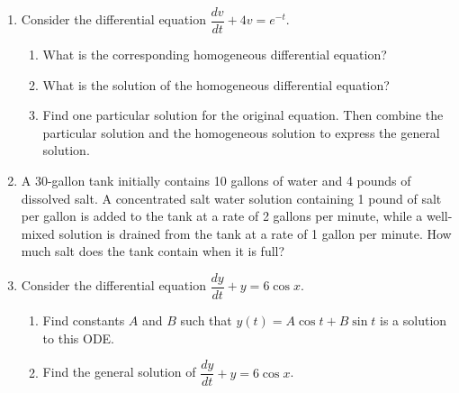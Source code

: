 \documentclass[10pt]{article}
\begin{document}
\newpage
\begin{enumerate}
\setcounter{enumi}{\theenumCount}
\item Consider the differential equation $\dfrac{dv}{dt} + 4v = e^{-t}$.  
\begin{enumerate}
\item What is the corresponding homogeneous differential equation? 
\vfill

\item What is the solution of the homogeneous differential equation?
\vfill

\item Find one particular solution for the original equation. Then combine the particular solution and the homogeneous solution to express the general solution.  
\vfill
\end{enumerate}


\item A 30-gallon tank initially contains 10 gallons of water and 4 pounds of dissolved salt.  A concentrated salt water solution containing 1 pound of salt per gallon is added to the tank at a rate of 2 gallons per minute, while a well-mixed solution is drained from the tank at a rate of 1 gallon per minute.  How much salt does the tank contain when it is full?
\vfill



\item Consider the differential equation $\dfrac{dy}{dt} + y = 6 \cos x.$
\begin{enumerate}
\item Find constants $A$ and $B$ such that $y(t) = A \cos t + B \sin t$ is a solution to this ODE.
\vfill


\item Find the general solution of $\dfrac{dy}{dt} + y = 6 \cos x$. 
\vfill
\end{enumerate}
\end{enumerate}
\end{document}
